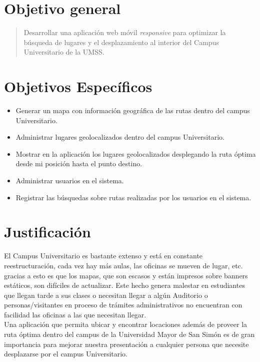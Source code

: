   \section{Objetivo general} %
  \label{sec:objetivo_general}
    \begin{quote}
      Desarrollar una aplicación web móvil \emph{responsive} para optimizar la búsqueda de lugares y el  desplazamiento al interior del Campus Universitario de la UMSS.
    \end{quote}


  \section{Objetivos Específicos} %
  \label{sec:obj_especificos}
    \begin{itemize}
      \item Generar un mapa con información geográfica de las rutas dentro del campus Universitario.
      \item Administrar lugares geolocalizados dentro del campus Universitario.
      \item Mostrar en la aplicación los lugares geolocalizados desplegando la ruta óptima desde mi posición hasta el punto destino.
      \item Administrar usuarios en el sistema.
      \item Registrar las búsquedas sobre rutas realizadas por los usuarios en el sistema.
    \end{itemize}


  \section{Justificación} %
  \label{sec:justificacion}
  El Campus Universitario es bastante extenso y está en constante reestructuración, cada vez hay más aulas, las oficinas se mueven de lugar, etc. gracias a esto es que los mapas, que son escasos y están impresos sobre banners estáticos, son difíciles de actualizar. Este hecho genera malestar en estudiantes que llegan tarde a sus clases o necesitan llegar a algún Auditorio o personas/visitantes en proceso de trámites administrativos no encuentran con facilidad las oficinas a las que necesitan llegar.\\


  Una aplicación que permita ubicar y encontrar locaciones además de proveer la ruta óptima dentro del campus de la Universidad Mayor de San Simón es de gran importancia para mejorar nuestra presentación a cualquier persona que necesite desplazarse por el campus Universitario.\\


